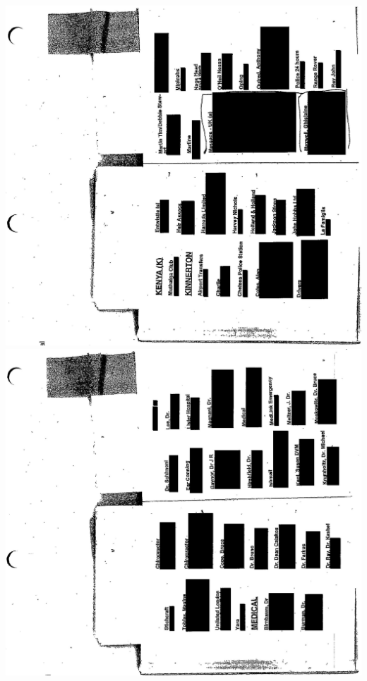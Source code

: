 \documentclass[10pt]{article}
\begin{document}
\includegraphics[max width=\textwidth, center]{2025_02_27_dd68c3d38de88f0516d9g-205}\\
\includegraphics[max width=\textwidth, center]{2025_02_27_dd68c3d38de88f0516d9g-206}
\end{document}
